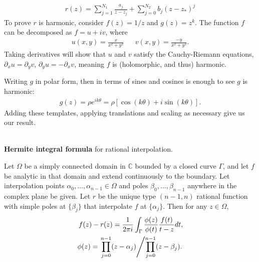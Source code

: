 \documentclass{seminar}
\begin{document}
\begin{slide} %
{} \small \\
\begin{align*}
r(z)= \sum_{j=1}^{N_1} \frac{a_j}{z-z_j} + \sum_{j=0}^{N_2} b_j (z-z_*)^j
\end{align*}
To prove $r$ is harmonic, consider $f(z)=1/z$ and $g(z)=z^k$.
The function $f$ can be decomposed as $f=u+iv$, where
\begin{align*}
u(x,y)=\frac{x}{x^2+y^2} &&
v(x,y)=\frac{-y}{x^2+y^2}.
\end{align*}
Taking derivatives will show that $u$ and $v$ satisfy the Cauchy-Riemann equations, ${\partial}_x u={\partial}_y v$, ${\partial}_y u=-{\partial}_x v$, meaning $f$ is (holomorphic, and thus) harmonic.

Writing $g$ in polar form, then in terms of sines and cosines is enough to see $g$ is harmonic:
\begin{align*}
g(z)=\rho e^{i k \theta} = \rho [\cos{(k\theta)} + i \sin{(k\theta)}] .
\end{align*}
Adding these templates, applying translations and scaling as necessary give us our result.
\end{slide} %




\begin{slide} %
{} \small \\

\textbf{Hermite integral formula} for rational interpolation.

Let $\Omega$ be a simply connected domain in $\mathds{C}$ bounded by a closed curve $\Gamma$, and let $f$ be analytic in that domain and extend continuously to the boundary. Let interpolation points ${\alpha}_0, \ldots ,{\alpha}_{n-1} \in \Omega$ and poles ${\beta}_0, \ldots ,{\beta}_{n-1}$ anywhere in the complex plane be given. Let $r$ be the unique type $(n-1,n)$ rational function with simple poles at $\{{\beta}_j\}$ that interpolate $f$ at $\{{\alpha}_j\}$. Then for any $z \in \Omega$,
\begin{align*}
f(z)-r(z)=\frac{1}{2 \pi i} \int_{\Gamma} \frac{\phi (z)}{\phi (t)} \frac{f(t)}{t-z}dt, \\
\phi (z) = \left. \prod_{j=0}^{n-1}(z-{\alpha}_j) \middle/ \prod_{j=0}^{n-1}(z-{\beta}_j). \right.
\end{align*}
\end{slide} %
\end{document}
